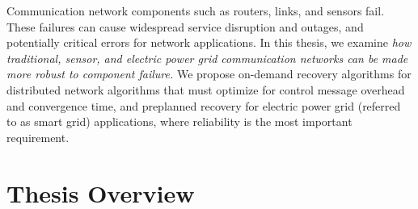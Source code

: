 

Communication network components such as routers, links, and sensors fail. %
These failures can cause widespread service disruption and outages, and potentially critical errors for network applications.
In this thesis, we examine \textit{how traditional, sensor, and electric power grid communication networks can be made more robust to component failure.}
We propose on-demand recovery algorithms for distributed network algorithms that must optimize for control message overhead and convergence time,
and preplanned recovery for electric power grid (referred to as smart grid) applications, where reliability is the most important requirement.




\section{Thesis Overview}

